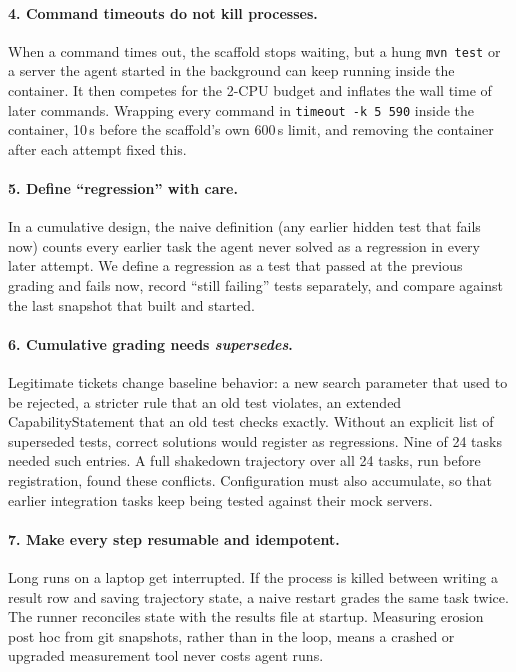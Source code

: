 \documentclass[10pt]{article}
\newcommand{\code}[1]{\texttt{#1}}
\begin{document}
\paragraph{4. Command timeouts do not kill processes.} When a command times out, the scaffold
stops waiting, but a hung \code{mvn test} or a server the agent started in the background can keep
running inside the container. It then competes for the 2-CPU budget and inflates the wall time of
later commands. Wrapping every command in \code{timeout -k 5 590} inside the container, 10\,s
before the scaffold's own 600\,s limit, and removing the container after each attempt fixed this.

\paragraph{5. Define ``regression'' with care.} In a cumulative design, the naive definition (any
earlier hidden test that fails now) counts every earlier task the agent never solved as a
regression in every later attempt. We define a regression as a test that passed at the previous
grading and fails now, record ``still failing'' tests separately, and compare against the last
snapshot that built and started.

\paragraph{6. Cumulative grading needs \emph{supersedes}.} Legitimate tickets change baseline
behavior: a new search parameter that used to be rejected, a stricter rule that an old test
violates, an extended CapabilityStatement that an old test checks exactly. Without an explicit
list of superseded tests, correct solutions would register as regressions. Nine of 24 tasks needed
such entries. A full shakedown trajectory over all 24 tasks, run before registration, found these
conflicts. Configuration must also accumulate, so that earlier integration tasks keep being tested
against their mock servers.

\paragraph{7. Make every step resumable and idempotent.} Long runs on a laptop get interrupted. If
the process is killed between writing a result row and saving trajectory state, a naive restart
grades the same task twice. The runner reconciles state with the results file at startup.
Measuring erosion post hoc from git snapshots, rather than in the loop, means a crashed or
upgraded measurement tool never costs agent runs.
\end{document}
